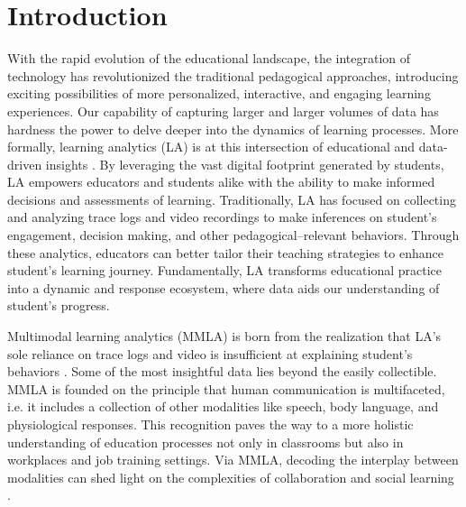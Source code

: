 \documentclass[manuscript,screen,review]{acmart}
\begin{document}
\section{Introduction} \label{sec:intro}

With the rapid evolution of the educational landscape, the integration of technology has revolutionized the traditional pedagogical approaches, introducing exciting possibilities of more personalized, interactive, and engaging learning experiences. Our capability of capturing larger and larger volumes of data has hardness the power to delve deeper into the dynamics of learning processes. More formally, learning analytics (LA) is at this intersection of educational and data-driven insights \cite{}. By leveraging the vast digital footprint generated by students, LA empowers educators and students alike with the ability to make informed decisions and assessments of learning. Traditionally, LA has focused on collecting and analyzing trace logs and video recordings to make inferences on student's engagement, decision making, and other pedagogical--relevant behaviors. Through these analytics, educators can better tailor their teaching strategies to enhance student's learning journey. Fundamentally, LA transforms educational practice into a dynamic and response ecosystem, where data aids our understanding of student's progress.

Multimodal learning analytics (MMLA) is born from the realization that LA's sole reliance on trace logs and video is insufficient at explaining student's behaviors \cite{}. Some of the most insightful data lies beyond the easily collectible. MMLA is founded on the principle that human communication is multifaceted, i.e. it includes a collection of other modalities like speech, body language, and physiological responses. This recognition paves the way to a more holistic understanding of education processes not only in classrooms but also in workplaces and job training settings. Via MMLA, decoding the interplay between modalities can shed light on the complexities of collaboration and social learning \cite{}.
\end{document}
